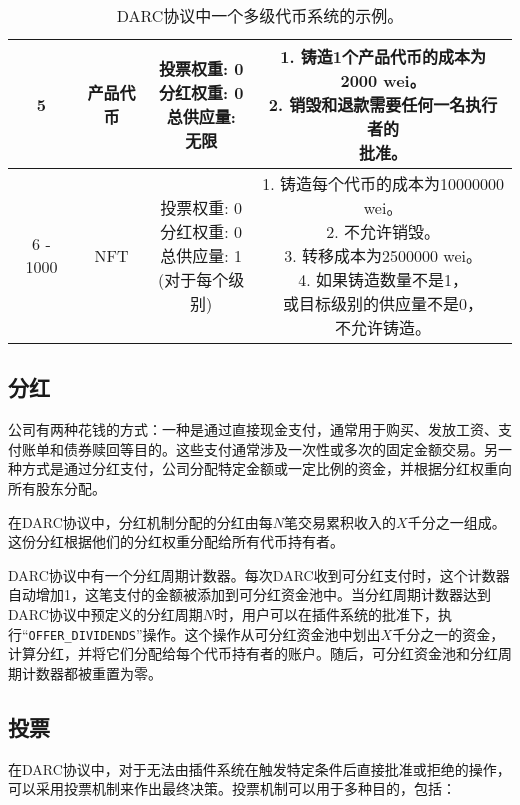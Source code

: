 \documentclass[main.tex]{subfiles}
\begin{document}
\begin{table}[h!]
\begin{tabular}{| c | c | c| c |}
    \hline 
    5 & 产品代币 & \makecell[l]{投票权重: 0 \\ 分红权重: 0 \\ 总供应量: 无限} & \makecell[l]{1. 铸造1个产品代币的成本为2000 wei。 \\ 2. 销毁和退款需要任何一名执行者的\\ 批准。} \\
    \hline
    6 - 1000 & NFT & \makecell[l]{投票权重: 0 \\ 分红权重: 0 \\ 总供应量: 1\\(对于每个级别)} & \makecell[l]{1. 铸造每个代币的成本为10000000 wei。 \\ 2. 不允许销毁。 \\ 3. 转移成本为2500000 wei。 \\ 4. 如果铸造数量不是1，\\ 或目标级别的供应量不是0，\\ 不允许铸造。} \\
    \hline
    \end{tabular}
    \caption{DARC协议中一个多级代币系统的示例。}
    \label{table:6}
    \end{table}

\subsection{分红}

公司有两种花钱的方式：一种是通过直接现金支付，通常用于购买、发放工资、支付账单和债券赎回等目的。这些支付通常涉及一次性或多次的固定金额交易。另一种方式是通过分红支付，公司分配特定金额或一定比例的资金，并根据分红权重向所有股东分配。

在DARC协议中，分红机制分配的分红由每$N$笔交易累积收入的$X$千分之一组成。这份分红根据他们的分红权重分配给所有代币持有者。

DARC协议中有一个分红周期计数器。每次DARC收到可分红支付时，这个计数器自动增加1，这笔支付的金额被添加到可分红资金池中。当分红周期计数器达到DARC协议中预定义的分红周期$N$时，用户可以在插件系统的批准下，执行“\texttt{OFFER\_DIVIDENDS}”操作。这个操作从可分红资金池中划出$X$千分之一的资金，计算分红，并将它们分配给每个代币持有者的账户。随后，可分红资金池和分红周期计数器都被重置为零。



\subsection{投票}

在DARC协议中，对于无法由插件系统在触发特定条件后直接批准或拒绝的操作，可以采用投票机制来作出最终决策。投票机制可以用于多种目的，包括：
\end{document}

